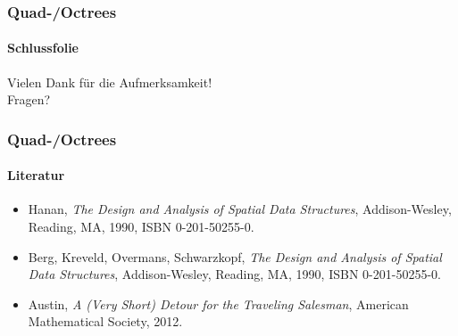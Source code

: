 \documentclass{beamer}
\begin{document}
\begin{frame}
  \frametitle{Quad-/Octrees}
  \framesubtitle{Schlussfolie}
  \begin{center}
    Vielen Dank für die Aufmerksamkeit! \\
    \hfill\break
    Fragen?
  \end{center}
\end{frame}

\begin{frame}
  \frametitle{Quad-/Octrees}
  \framesubtitle{Literatur}
  \begin{itemize}
    \item Hanan, \emph{The Design and Analysis of Spatial Data Structures}, Addison-Wesley, Reading, MA, 1990, ISBN 0-201-50255-0.
    \item Berg, Kreveld, Overmans, Schwarzkopf, \emph{The Design and Analysis of Spatial Data Structures}, Addison-Wesley, Reading, MA, 1990, ISBN 0-201-50255-0.
    \item Austin, \emph{A (Very Short) Detour for the Traveling Salesman}, American Mathematical Society, 2012.
  \end{itemize}
\end{frame}
\end{document}
